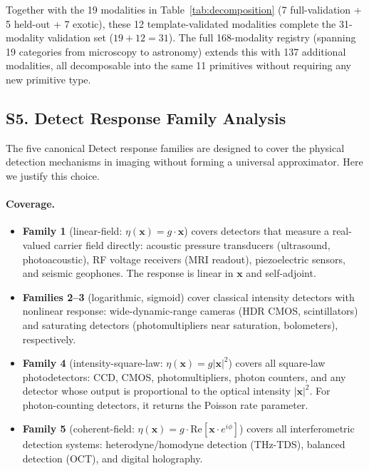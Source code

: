 Together with the 19 modalities in Table~\ref{tab:decomposition} (7 full-validation + 5 held-out + 7 exotic), these 12 template-validated modalities complete the 31-modality validation set ($19 + 12 = 31$). The full 168-modality registry (spanning 19 categories from microscopy to astronomy) extends this with 137 additional modalities, all decomposable into the same 11 primitives without requiring any new primitive type.


\subsection*{S5. Detect Response Family Analysis}
\label{sec:supp_detect}

The five canonical Detect response families are designed to cover the physical detection mechanisms in imaging without forming a universal approximator. Here we justify this choice.

\paragraph{Coverage.}
\begin{itemize}
  \item \textbf{Family 1} (linear-field: $\eta(\mathbf{x}) = g\cdot\mathbf{x}$) covers detectors that measure a real-valued carrier field directly: acoustic pressure transducers (ultrasound, photoacoustic), RF voltage receivers (MRI readout), piezoelectric sensors, and seismic geophones. The response is linear in $\mathbf{x}$ and self-adjoint.
  \item \textbf{Families 2--3} (logarithmic, sigmoid) cover classical intensity detectors with nonlinear response: wide-dynamic-range cameras (HDR CMOS, scintillators) and saturating detectors (photomultipliers near saturation, bolometers), respectively.
  \item \textbf{Family 4} (intensity-square-law: $\eta(\mathbf{x}) = g|\mathbf{x}|^2$) covers all square-law photodetectors: CCD, CMOS, photomultipliers, photon counters, and any detector whose output is proportional to the optical intensity $|\mathbf{x}|^2$. For photon-counting detectors, it returns the Poisson rate parameter.
  \item \textbf{Family 5} (coherent-field: $\eta(\mathbf{x}) = g \cdot \mathrm{Re}[\mathbf{x} \cdot e^{i\phi}]$) covers all interferometric detection systems: heterodyne/homodyne detection (THz-TDS), balanced detection (OCT), and digital holography.
\end{itemize}

